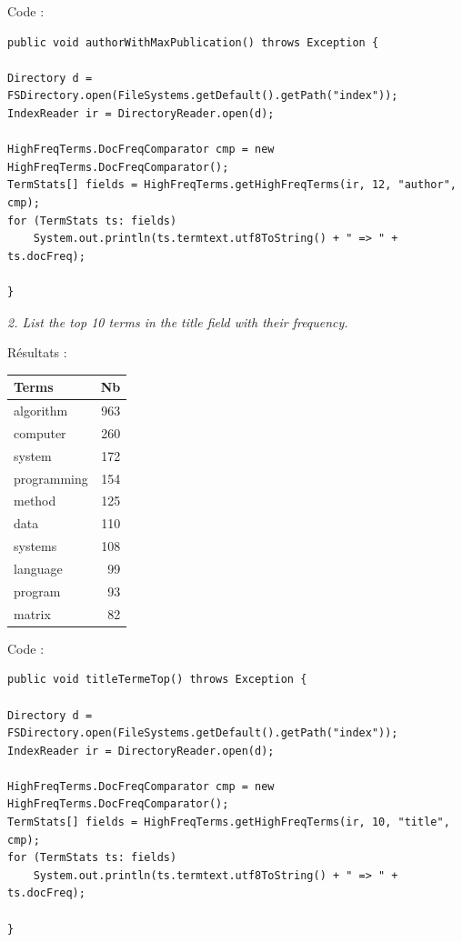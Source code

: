 Code :

\lstset{language=Java}
\begin{lstlisting}
public void authorWithMaxPublication() throws Exception {

Directory d = FSDirectory.open(FileSystems.getDefault().getPath("index"));
IndexReader ir = DirectoryReader.open(d);

HighFreqTerms.DocFreqComparator cmp = new HighFreqTerms.DocFreqComparator();
TermStats[] fields = HighFreqTerms.getHighFreqTerms(ir, 12, "author", cmp);
for (TermStats ts: fields)
    System.out.println(ts.termtext.utf8ToString() + " => " + ts.docFreq);

}
\end{lstlisting}

\textit{2. List the top 10 terms in the title field with their frequency.}

Résultats :

\begin{center}
    \begin{tabular}{|l|r|}
      \hline
      Terms & Nb \\
      \hline
      algorithm & 963 \\
      computer & 260 \\
      system & 172 \\
      programming & 154 \\
      method & 125 \\
      data & 110 \\
      systems & 108 \\
      language & 99 \\
      program & 93 \\
      matrix & 82 \\
      \hline
    \end{tabular}
\end{center}

Code :

\begin{lstlisting}
public void titleTermeTop() throws Exception {

Directory d = FSDirectory.open(FileSystems.getDefault().getPath("index"));
IndexReader ir = DirectoryReader.open(d);

HighFreqTerms.DocFreqComparator cmp = new HighFreqTerms.DocFreqComparator();
TermStats[] fields = HighFreqTerms.getHighFreqTerms(ir, 10, "title", cmp);
for (TermStats ts: fields)
    System.out.println(ts.termtext.utf8ToString() + " => " + ts.docFreq);

}
\end{lstlisting}

